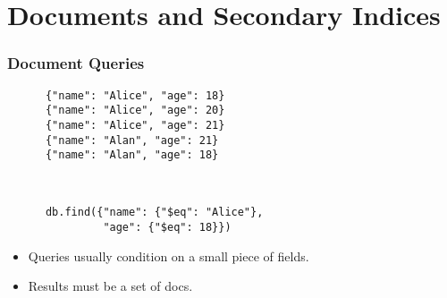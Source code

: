 \documentclass[lualatex]{beamer}
\begin{document}
\section{Documents and Secondary Indices}
\frame{\tableofcontents[currentsection]}

\begin{frame}[fragile]
  \frametitle{Document Queries}
  \begin{center}
    \begin{verbatim}
      {"name": "Alice", "age": 18}
      {"name": "Alice", "age": 20}
      {"name": "Alice", "age": 21}
      {"name": "Alan", "age": 21}
      {"name": "Alan", "age": 18}
    \end{verbatim}
  \end{center}
  \begin{block}{~}
    \begin{verbatim}
      db.find({"name": {"$eq": "Alice"},
               "age": {"$eq": 18}})
    \end{verbatim}
    \begin{itemize}
      \item Queries usually condition on a small piece of fields.
      \item Results must be a set of docs.
    \end{itemize}
  \end{block}
\end{frame}
\end{document}
